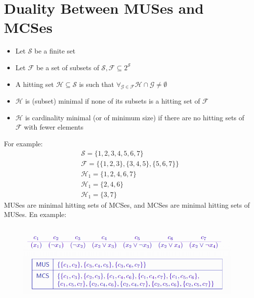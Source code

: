 \documentclass[10pt,a4paper]{report}
\begin{document}
\section{Duality Between MUSes and MCSes}
\begin{itemize}
    \item Let $\mathcal{S}$ be a finite set
    \item Let $\mathcal{F}$ be a set of subsets of $\mathcal{S}, \mathcal{F} \subseteq 2^\mathcal{S}$
    \item A hitting set $\mathcal{H} \subseteq \mathcal{S}$ is such that $\forall_{\mathcal{G} \in \mathcal{F}} \mathcal{H} \cap \mathcal{G} \neq \emptyset$
    \item $\mathcal{H}$ is (subset) minimal  if none of its subsets is a hitting set of $\mathcal{F}$
    \item $\mathcal{H}$ is cardinality minimal (or of minimum size) if there are no hitting sets of $\mathcal{F}$ with fewer elements
\end{itemize}
For example:
\begin{align*}
    &\mathcal{S} = \{1, 2, 3, 4, 5, 6, 7\}\\
    &\mathcal{F} = \{\{1, 2, 3\}, \{3, 4, 5\}, \{5, 6, 7\}\}\\
    &\mathcal{H}_1 = \{1, 2, 4, 6, 7\}\\
    &\mathcal{H}_1 = \{2, 4, 6\}\\
    &\mathcal{H}_1 = \{3, 7\}
\end{align*}
MUSes are minimal hitting sets of MCSes, and MCSes are minimal hitting sets of MUSes. En example:
\begin{figure}[H]
    \centering
    \includegraphics[scale=0.5]{17.png}
\end{figure}
\end{document}
